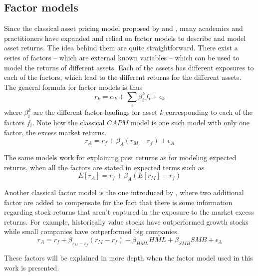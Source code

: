 \subsection{Factor models}
Since the classical asset pricing model proposed by \cite{sharpe_1964} and \cite{lintner_1975}, many academics and practitioners have expanded and relied on factor models to describe and model asset returns. The idea behind them are quite straightforward. There exist a series of factors -- which are external known variables -- which can be used to model the returns of different assets. Each of the assets has different exposures to each of the factors, which lead to the different returns for the different assets. The general formula for factor models is thus
\begin{equation}
    r_k = \alpha_k + \sum_{i}\beta_i^k f_i + \epsilon_k
\end{equation}
where $\beta_i^k$ are the different factor loadings for asset $k$ corresponding to each of the factors $f_i$. 
Note how the classical $CAPM$ model is one such model with only one factor, the excess market returns. 
\begin{equation}
    r_A=r_f+\beta_A(r_M-r_f) + \epsilon_A    
\end{equation}

The same models work for explaining past returns as for modeling expected returns, when all the factors are stated in expected terms such as
\begin{equation}
    E\left[r_A\right]=r_f+\beta_A(E\left[r_M\right]-r_f)
\end{equation}

Another classical factor model is the one introduced by \cite{french_1992}, where two additional factor are added to compensate for the fact that there is some information regarding stock returns that aren't captured in the exposure to the market excess returns. For example, historically value stocks have outperformed growth stocks while small companies have outperformed big companies.
\begin{equation}
    r_A=r_f + \beta_{r_M-r_f}(r_M-r_f) + \beta_{HML}HML + \beta_{SMB}SMB + \epsilon_A
\end{equation}

These factors will be explained in more depth when the factor model used in this work is presented. 

